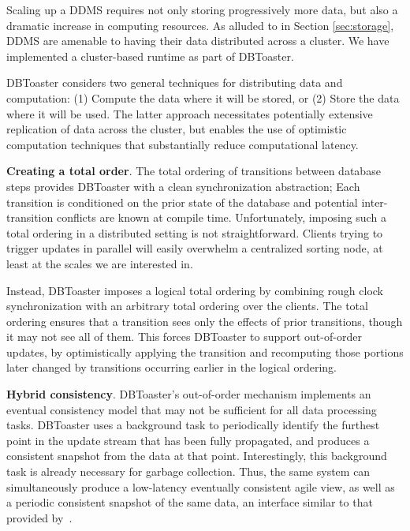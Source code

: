 Scaling up a DDMS requires not only storing progressively more data, but also a
dramatic increase in computing resources.  As alluded to in Section
\ref{sec:storage}, DDMS are amenable to having their data distributed across a
cluster.  We have implemented a cluster-based runtime as part of DBToaster.


DBToaster considers two general techniques for distributing data and
computation: (1) Compute the data where it will be stored, or (2) Store the data
where it will be used.  The latter approach necessitates potentially extensive
replication of data across the cluster, but enables the use of optimistic
computation techniques that substantially reduce computational latency.

\medspace 

{\bf Creating a total order}\/.
The total ordering of transitions between database steps provides DBToaster with
a clean synchronization abstraction; Each transition is conditioned on the prior
state of the database and potential inter-transition conflicts are known at
compile time.  Unfortunately, imposing such a total ordering in a distributed
setting is not straightforward.  Clients trying to trigger updates in parallel
will easily overwhelm a centralized sorting node, at least at the scales we are
interested in.

Instead, DBToaster imposes a logical total ordering by combining rough clock
synchronization with an arbitrary total ordering over the clients.  The total
ordering ensures that a transition sees only the effects of prior transitions,
though it may not see all of them.  This forces DBToaster to support
out-of-order updates, by optimistically applying the transition and recomputing
those portions later changed by transitions occurring earlier in the logical
ordering.

\medspace

{\bf Hybrid consistency}\/.
DBToaster's out-of-order mechanism implements an eventual consistency model that
may not be sufficient for all data processing tasks.  DBToaster uses a
background task to periodically identify the furthest point in the update stream
that has been fully propagated, and produces a consistent snapshot from the data
at that point.  Interestingly, this background task is already necessary for
garbage collection.  Thus, the same system can simultaneously produce a
low-latency eventually consistent agile view, as well as a periodic consistent
snapshot of the same data, an interface similar to that provided
by~\cite{bayou}.

